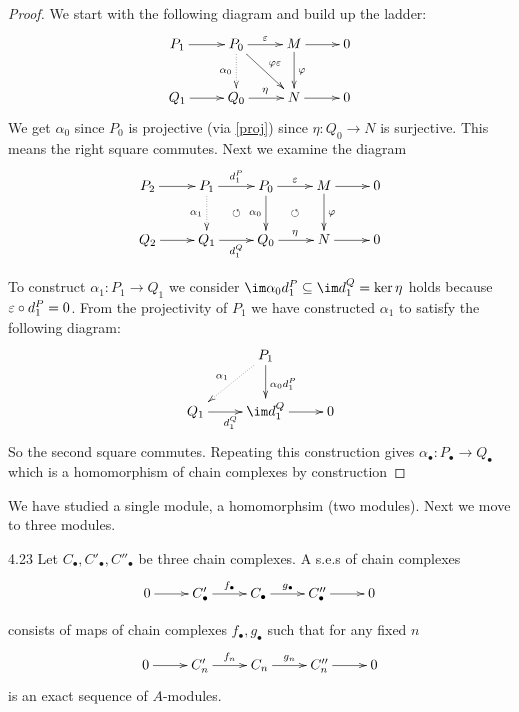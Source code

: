 \documentclass[twoside = false,	%
		headsepline,		%
		parskip = true,
		]{scrbook}						%
\begin{document}
    \begin{proof}
        We start with the following diagram and build up the ladder:
        \begin{equation*}
        \xymatrix {
            P_1 \ar[r] & P_0 \ar[r]^{\e} \ar[dr]^{\varphi \e} \ar@{.>}[d]_{\alpha_0} & M \ar[r] \ar[d]^{\varphi} & 0 \\
            Q_1 \ar[r] & Q_0 \ar[r]^{\eta} & N \ar[r]& 0
        }
        \end{equation*}
        We get $\alpha_0$ since $P_0$ is projective (via \eqref{proj}) since $\eta: Q_0 \to N$ is surjective. This means the right square commutes. Next we examine the diagram
        \begin{equation*}
        \xymatrix {
            P_2 \ar[r] & P_1 \ar[r]^{d_1^P} \ar@{.>}[d]_{\alpha_1} & P_0 \ar[r]^{\e} \ar[d]_{\alpha_0} & M \ar[r] \ar[d]^{\varphi} & 0 \\
            Q_2 \ar[r] & Q_1 \ar[r]_{d_1^Q} \ar@{}[ur]|{\circlearrowleft} & Q_0 \ar[r]^{\eta} \ar@{}[ur]|{\circlearrowleft} & N \ar[r]& 0
        }
        \end{equation*}

        To construct $\alpha_1: P_1 \to Q_1$ we consider $\im \alpha_0 d_1^P \subseteq \im d_1^Q = \ker \eta$ holds because $\varepsilon \circ d_1^P = 0$. From the projectivity of $P_1$ we have constructed $\alpha_1$ to satisfy the following diagram:
        \begin{equation*}
        \xymatrix {
            & P_1 \ar@{.>}[dl]_{\alpha_1} \ar[d]^{\alpha_0 d_1^P} \\
            Q_1 \ar[r]_{d_1^Q}& \im d_1^Q \ar[r] & 0
        }
        \end{equation*}
        So the second square commutes. Repeating this construction gives $\alpha_\bullet: P_\bullet \to Q_\bullet$ which is a homomorphism of chain complexes by construction
    \end{proof}

    We have studied a single module, a homomorphsim (two modules). Next we move to three modules.

    \begin{definition}{}{4.23}
        Let $C_\bullet,C'_\bullet,C''_\bullet$ be three chain complexes. A s.e.s of chain complexes
        \begin{equation*}
        \xymatrix {
            0 \ar[r] & C'_\bullet \ar[r]^{f_\bullet} & C_\bullet \ar[r]^{g_\bullet} & C''_\bullet \ar[r] & 0
        }
        \end{equation*}
        
        consists of maps of chain complexes $f_\bullet, g_\bullet$ such that for any fixed $n$
        \begin{equation*}
        \xymatrix {
            0 \ar[r] & C'_n \ar[r]^{f_n} & C_n \ar[r]^{g_n} & C''_n \ar[r] & 0
        }
        \end{equation*}
        is an exact sequence of $A$-modules.
    \end{definition}
    
\end{document}
